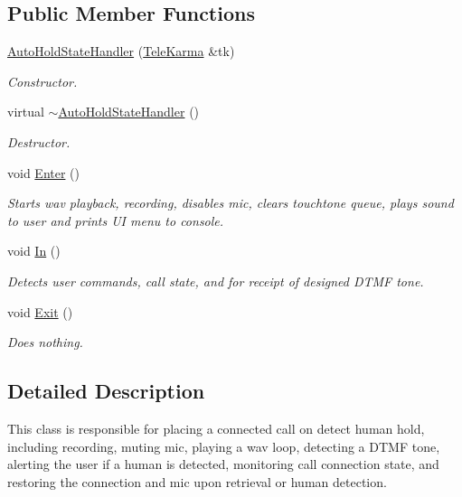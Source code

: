 \subsection*{Public Member Functions}
\begin{CompactItemize}
\item 
\hyperlink{classAutoHoldStateHandler_3537482b30296c65f6380f25291a8d3d}{AutoHoldStateHandler} (\hyperlink{classTeleKarma}{TeleKarma} \&tk)
\begin{CompactList}\small\item\em Constructor. \item\end{CompactList}\item 
virtual \hyperlink{classAutoHoldStateHandler_b4022aa559ad037e07fbd4f9a395d3f6}{$\sim$AutoHoldStateHandler} ()
\begin{CompactList}\small\item\em Destructor. \item\end{CompactList}\item 
void \hyperlink{classAutoHoldStateHandler_e2ceac17b4e28f9ca869bd0130659aad}{Enter} ()
\begin{CompactList}\small\item\em Starts wav playback, recording, disables mic, clears touchtone queue, plays sound to user and prints UI menu to console. \item\end{CompactList}\item 
void \hyperlink{classAutoHoldStateHandler_ae7396add19df1c6e3199cfb533df040}{In} ()
\begin{CompactList}\small\item\em Detects user commands, call state, and for receipt of designed DTMF tone. \item\end{CompactList}\item 
void \hyperlink{classAutoHoldStateHandler_c601de6921ba53a17531dea0d00f493b}{Exit} ()
\begin{CompactList}\small\item\em Does nothing. \item\end{CompactList}\end{CompactItemize}


\subsection{Detailed Description}
This class is responsible for placing a connected call on detect human hold, including recording, muting mic, playing a wav loop, detecting a DTMF tone, alerting the user if a human is detected, monitoring call connection state, and restoring the connection and mic upon retrieval or human detection. 

